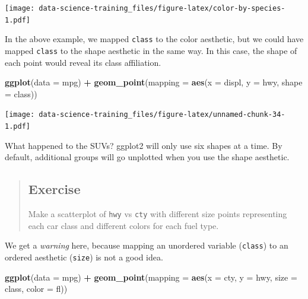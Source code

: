 \documentclass[]{book}
\newenvironment{Shaded}{\begin{snugshade}}{\end{snugshade}}
\newcommand{\KeywordTok}[1]{\textcolor[rgb]{0.13,0.29,0.53}{\textbf{#1}}}
\newcommand{\DataTypeTok}[1]{\textcolor[rgb]{0.13,0.29,0.53}{#1}}
\newcommand{\StringTok}[1]{\textcolor[rgb]{0.31,0.60,0.02}{#1}}
\newcommand{\OperatorTok}[1]{\textcolor[rgb]{0.81,0.36,0.00}{\textbf{#1}}}
\newcommand{\NormalTok}[1]{#1}
\theoremstyle{definition}
\theoremstyle{definition}
\theoremstyle{definition}
\theoremstyle{remark}
\begin{document}
\texttt{[image: data-science-training\_files/figure-latex/color-by-species-1.pdf]}

In the above example, we mapped \texttt{class} to the color aesthetic,
but we could have mapped \texttt{class} to the shape aesthetic in the
same way. In this case, the shape of each point would reveal its class
affiliation.

\begin{Shaded}
\begin{Highlighting}[]
\KeywordTok{ggplot}\NormalTok{(}\DataTypeTok{data =}\NormalTok{ mpg) }\OperatorTok{+}\StringTok{ }
\StringTok{  }\KeywordTok{geom_point}\NormalTok{(}\DataTypeTok{mapping =} \KeywordTok{aes}\NormalTok{(}\DataTypeTok{x =}\NormalTok{ displ, }\DataTypeTok{y =}\NormalTok{ hwy, }\DataTypeTok{shape =}\NormalTok{ class))}
\end{Highlighting}
\end{Shaded}

\texttt{[image: data-science-training\_files/figure-latex/unnamed-chunk-34-1.pdf]}

What happened to the SUVs? ggplot2 will only use six shapes at a time.
By default, additional groups will go unplotted when you use the shape
aesthetic.

\begin{quote}
\subsection{Exercise}\label{exercise}

Make a scatterplot of \texttt{hwy} vs \texttt{cty} with different size
points representing each car class and different colors for each fuel
type.
\end{quote}

We get a \emph{warning} here, because mapping an unordered variable
(\texttt{class}) to an ordered aesthetic (\texttt{size}) is not a good
idea.

\begin{Shaded}
\begin{Highlighting}[]
\KeywordTok{ggplot}\NormalTok{(}\DataTypeTok{data =}\NormalTok{ mpg) }\OperatorTok{+}\StringTok{ }
\StringTok{  }\KeywordTok{geom_point}\NormalTok{(}\DataTypeTok{mapping =} \KeywordTok{aes}\NormalTok{(}\DataTypeTok{x =}\NormalTok{ cty, }\DataTypeTok{y =}\NormalTok{ hwy, }\DataTypeTok{size =}\NormalTok{ class, }\DataTypeTok{color =}\NormalTok{ fl))}
\end{Highlighting}
\end{Shaded}
\end{document}
